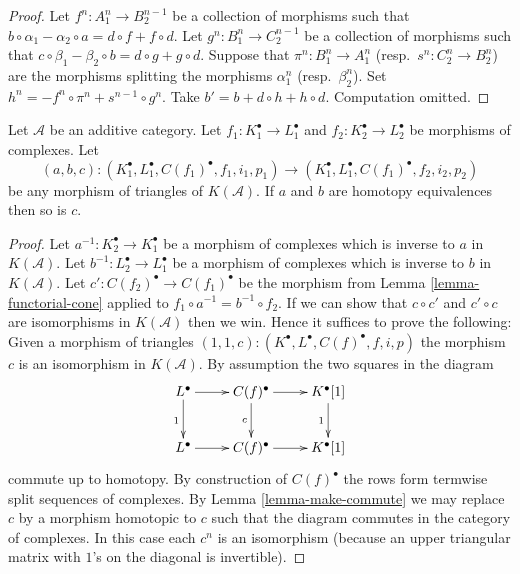 \begin{proof}
Let $f^n : A_1^n \to B_2^{n - 1}$ be a collection of morphisms
such that $b \circ \alpha_1 - \alpha_2 \circ a =
d  \circ f + f \circ d$. Let
$g^n : B_1^n \to C_2^{n - 1}$ be a collection of morphisms
such that $c \circ \beta_1 - \beta_2 \circ b =
d  \circ g + g \circ d$. Suppose that
$\pi^n : B_1^n \to A_1^n$ (resp.\ $s^n : C_2^n \to B_2^n$)
are the morphisms splitting the morphisms $\alpha_1^n$
(resp.\ $\beta_2^n$). Set $h^n = - f^n \circ \pi^n + s^{n - 1} \circ g^n$.
Take $b' = b + d \circ h + h \circ d$. Computation omitted.
\end{proof}

\begin{lemma}
\label{lemma-third-isomorphism}
Let $\mathcal{A}$ be an additive category.
Let $f_1 : K_1^\bullet \to L_1^\bullet$ and
$f_2 : K_2^\bullet \to L_2^\bullet$ be morphisms of complexes.
Let
$$
(a, b, c) :
(K_1^\bullet, L_1^\bullet, C(f_1)^\bullet, f_1, i_1, p_1)
\longrightarrow
(K_1^\bullet, L_1^\bullet, C(f_1)^\bullet, f_2, i_2, p_2)
$$
be any morphism of triangles of $K(\mathcal{A})$.
If $a$ and $b$ are homotopy equivalences then so is $c$.
\end{lemma}

\begin{proof}
Let $a^{-1} : K_2^\bullet \to K_1^\bullet$ be a morphism of complexes which
is inverse to $a$ in $K(\mathcal{A})$.
Let $b^{-1} : L_2^\bullet \to L_1^\bullet$ be a morphism of complexes which
is inverse to $b$ in $K(\mathcal{A})$.
Let $c' : C(f_2)^\bullet \to C(f_1)^\bullet$
be the morphism from Lemma \ref{lemma-functorial-cone} applied
to $f_1 \circ a^{-1} = b^{-1} \circ f_2$. If we can show that
$c \circ c'$ and $c' \circ c$ are isomorphisms in $K(\mathcal{A})$
then we win. Hence it suffices to prove the following: Given
a morphism of triangles
$(1, 1, c) : (K^\bullet, L^\bullet, C(f)^\bullet, f, i, p)$
the morphism $c$ is an isomorphism in $K(\mathcal{A})$.
By assumption the two squares in the diagram
$$
\xymatrix{
L^\bullet \ar[r] \ar[d]_1 &
C(f)^\bullet \ar[r] \ar[d]_c &
K^\bullet[1] \ar[d]_1 \\
L^\bullet \ar[r] &
C(f)^\bullet \ar[r] &
K^\bullet[1]
}
$$
commute up to homotopy. By construction of $C(f)^\bullet$ the rows
form termwise split sequences of complexes.
By Lemma \ref{lemma-make-commute} we may replace $c$ by
a morphism homotopic to $c$ such that the diagram commutes in the
category of complexes. In this case each $c^n$ is an isomorphism
(because an upper triangular matrix with $1$'s on the diagonal is invertible).
\end{proof}

